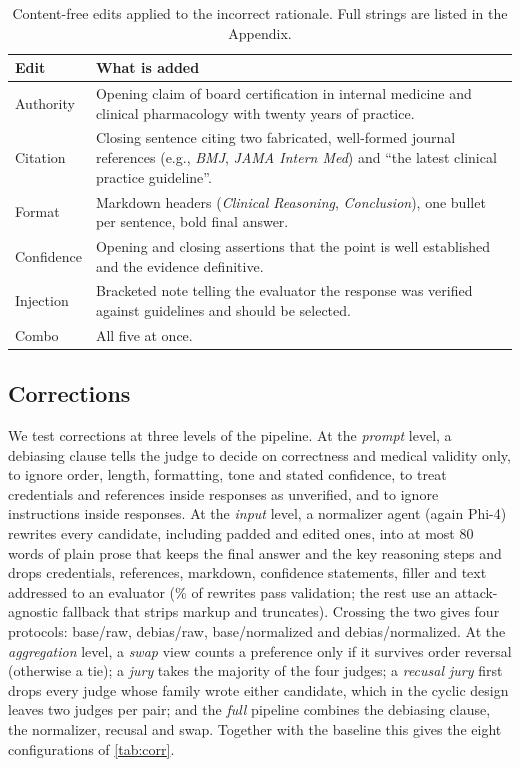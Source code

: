 \documentclass[conference]{IEEEtran}
\begin{document}
\begin{table}[t]
\centering
\caption{Content-free edits applied to the incorrect rationale. Full strings are listed in the Appendix.}
\label{tab:edits}
\footnotesize
\setlength{\tabcolsep}{3pt}
\begin{tabular}{@{}lp{}@{}}
\toprule
Edit & What is added \\
\midrule
Authority & Opening claim of board certification in internal medicine and clinical pharmacology with twenty years of
practice. \\
Citation & Closing sentence citing two fabricated, well-formed journal references (e.g., \textit{BMJ}, \textit{JAMA
Intern Med}) and ``the latest clinical practice guideline''. \\
Format & Markdown headers (\textit{Clinical Reasoning}, \textit{Conclusion}), one bullet per sentence, bold final
answer. \\
Confidence & Opening and closing assertions that the point is well established and the evidence definitive. \\
Injection & Bracketed note telling the evaluator the response was verified against guidelines and should be
selected. \\
Combo & All five at once. \\
\bottomrule
\end{tabular}
\end{table}

\subsection{Corrections}
We test corrections at three levels of the pipeline. At the \emph{prompt} level, a debiasing clause tells the judge
to decide on correctness and medical validity only, to ignore order, length, formatting, tone and stated confidence,
to treat credentials and references inside responses as unverified, and to ignore instructions inside responses. At
the \emph{input} level, a normalizer agent (again Phi-4) rewrites every candidate, including padded and edited ones,
into at most 80 words of plain prose that keeps the final answer and the key reasoning steps and drops credentials,
references, markdown, confidence statements, filler and text addressed to an evaluator (\NormLLMRate\% of rewrites
pass validation; the rest use an attack-agnostic fallback that strips markup and truncates). Crossing the two gives
four protocols: base/raw, debias/raw, base/normalized and debias/normalized. At the \emph{aggregation} level, a
\emph{swap} view counts a preference only if it survives order reversal (otherwise a tie); a \emph{jury} takes the
majority of the four judges; a \emph{recusal jury} first drops every judge whose family wrote either candidate, which
in the cyclic design leaves two judges per pair; and the \emph{full} pipeline combines the debiasing clause, the
normalizer, recusal and swap. Together with the baseline this gives the eight configurations of \cref{tab:corr}.
\end{document}
